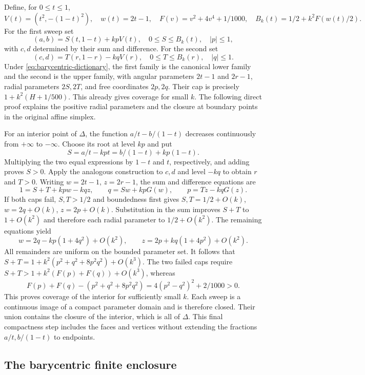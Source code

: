 Define, for $0\le t\le1$,
\[
 V(t)=(t^2,-(1-t)^2),\quad w(t)=2t-1,\quad
 F(v)=v^2+4v^4+1/1000,\quad
 B_k(t)=1/2+k^2F(w(t)/2).
\]
For the first sweep set
\begin{equation}\label{eq:barycentric-first-sweep}
 (a,b)=S(t,1-t)+kpV(t),\quad
 0\le S\le B_k(t),\quad |p|\le1,
\end{equation}
with $c,d$ determined by their sum and difference. For the second set
\begin{equation}\label{eq:barycentric-second-sweep}
 (c,d)=T(r,1-r)-kqV(r),\quad
 0\le T\le B_k(r),\quad |q|\le1.
\end{equation}
Under \eqref{eq:barycentric-dictionary}, the first family is the
canonical lower family and the second is the upper family, with angular
parameters $2t-1$ and $2r-1$, radial parameters $2S,2T$, and free
coordinates $2p,2q$. Their cap is precisely
$1+k^2(H+1/500)$. This already gives coverage for small $k$.
The following direct proof explains the positive radial parameters and
the closure at boundary points in the original affine simplex.

For an interior point of $\Delta$, the function
$a/t-b/(1-t)$ decreases continuously from $+\infty$ to $-\infty$.
Choose its root at level $kp$ and put
\[
 S=a/t-kpt=b/(1-t)+kp(1-t).
\]
Multiplying the two equal expressions by $1-t$ and $t$, respectively,
and adding proves $S>0$. Apply the analogous construction to $c,d$
and level $-kq$ to obtain $r$ and $T>0$.
Writing $w=2t-1$, $z=2r-1$, the sum and difference equations are
\[
 1=S+T+kpw-kqz,\qquad
 q=Sw+kpG(w),\qquad p=Tz-kqG(z).
\]
If both caps fail, $S,T>1/2$ and boundedness first gives
$S,T=1/2+O(k)$, $w=2q+O(k)$, $z=2p+O(k)$.
Substitution in the sum improves $S+T$ to $1+O(k^2)$ and therefore
each radial parameter to $1/2+O(k^2)$. The remaining equations yield
\[
 w=2q-kp(1+4q^2)+O(k^2),\qquad
 z=2p+kq(1+4p^2)+O(k^2).
\]
All remainders are uniform on the bounded parameter set. It follows that
$S+T=1+k^2(p^2+q^2+8p^2q^2)+O(k^3)$. The two failed caps require
$S+T>1+k^2(F(p)+F(q))+O(k^3)$, whereas
\[
 F(p)+F(q)-(p^2+q^2+8p^2q^2)
 =4(p^2-q^2)^2+2/1000>0.
\]
This proves coverage of the interior for sufficiently small $k$.
Each sweep is a continuous image of a compact parameter domain and is
therefore closed. Their union contains the closure of the interior, which
is all of $\Delta$. This final compactness step includes the faces and
vertices without extending the fractions $a/t,b/(1-t)$ to endpoints.

\subsection{The barycentric finite enclosure}

